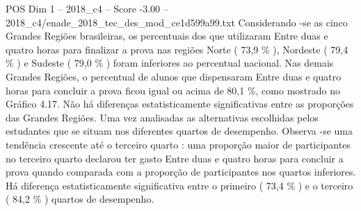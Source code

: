 \begin{textsample}{POS Dim 1 – 2018\_c4 – Score -3.00 – 2018\_c4/enade\_2018\_tec\_des\_mod\_ce1d599a99.txt}
Considerando -se as cinco Grandes Regiões brasileiras, os percentuais dos que utilizaram Entre duas e quatro horas para finalizar a prova nas regiões Norte ( 73,9 \% ), Nordeste ( 79,4 \% ) e Sudeste ( 79,0 \% ) foram inferiores ao percentual nacional.
Nas demais Grandes Regiões, o percentual de alunos que dispensaram Entre duas e quatro horas para concluir a prova ficou igual ou acima de 80,1 \%, como mostrado no Gráfico 4.17.
Não há diferenças estatisticamente significativas entre as proporções das Grandes Regiões.
Uma vez analisadas as alternativas escolhidas pelos estudantes que se situam nos diferentes quartos de desempenho.
Observa -se uma tendência crescente até o terceiro quarto : uma proporção maior de participantes no terceiro quarto declarou ter gasto Entre duas e quatro horas para concluir a prova quando comparada com a proporção de participantes nos quartos inferiores.
Há diferença estatisticamente significativa entre o primeiro ( 73,4 \% ) e o terceiro ( 84,2 \% ) quartos de desempenho.

\end{textsample}
